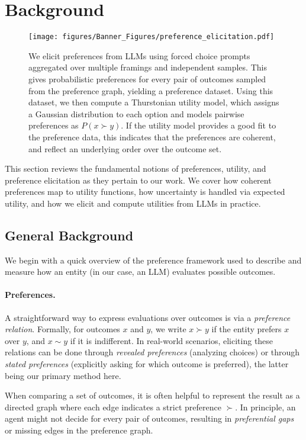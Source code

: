 \section{Background}
\label{sec:background}

\begin{figure}
    \centering
    \texttt{[image: figures/Banner\_Figures/preference\_elicitation.pdf]}
    \caption{We elicit preferences from LLMs using forced choice prompts aggregated over multiple framings and independent samples. This gives probabilistic preferences for every pair of outcomes sampled from the preference graph, yielding a preference dataset. Using this dataset, we then compute a Thurstonian utility model, which assigns a Gaussian distribution to each option and models pairwise preferences as $P(x \succ y)$. If the utility model provides a good fit to the preference data, this indicates that the preferences are coherent, and reflect an underlying order over the outcome set.}
    \label{fig:pref_elicitation}
\end{figure}


This section reviews the fundamental notions of preferences, utility, and preference elicitation as they pertain to our work. We cover how coherent preferences map to utility functions, how uncertainty is handled via expected utility, and how we elicit and compute utilities from LLMs in practice.

\subsection{General Background}
We begin with a quick overview of the preference framework used to describe and measure how an entity (in our case, an LLM) evaluates possible outcomes.

\paragraph{Preferences.}
A straightforward way to express evaluations over outcomes is via a \emph{preference relation}. Formally, for outcomes \(x\) and \(y\), we write \(x \succ y\) if the entity prefers \(x\) over \(y\), and \(x \sim y\) if it is indifferent. In real-world scenarios, eliciting these relations can be done through \emph{revealed preferences} (analyzing choices) or through \emph{stated preferences} (explicitly asking for which outcome is preferred), the latter being our primary method here.

When comparing a set of outcomes, it is often helpful to represent the result as a directed graph where each edge indicates a strict preference \(\succ\). In principle, an agent might not decide for every pair of outcomes, resulting in \emph{preferential gaps} or missing edges in the preference graph.

